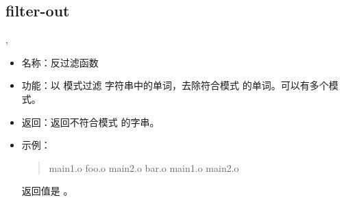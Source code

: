 \documentclass[a4paper,10pt]{sphinxmanual}
\begin{document}
\subsection{filter-out}
\label{\detokenize{functions:filter-out}}
\begin{sphinxVerbatim}[commandchars=\\\{\}]
 \PYGZlt{}\PYGZgt{},\PYGZlt{}\PYGZgt{}
\end{sphinxVerbatim}
\begin{itemize}
\item {} 
名称：反过滤函数

\item {} 
功能：以  模式过滤  字符串中的单词，去除符合模式
 的单词。可以有多个模式。

\item {} 
返回：返回不符合模式  的字串。

\item {} 
示例：
\begin{quote}

\begin{sphinxVerbatim}[commandchars=\\\{\}]
main1.o foo.o main2.o bar.o
main1.o main2.o
\end{sphinxVerbatim}
\end{quote}

 返回值是  。

\end{itemize}
\end{document}

